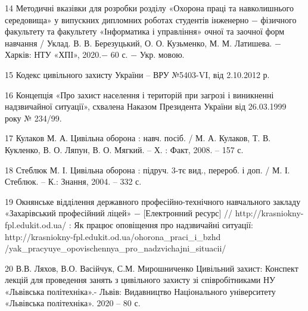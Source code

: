 14 Методичні вказівки для розробки розділу «Охорона праці та навколишнього середовища» у випускних дипломних роботах студентів інженерно $-$ фізичного факультету та факультету «Інформатика і управління» очної та заочної форм навчання / Уклад. В. В. Березуцький, О. О. Кузьменко, М. М. Латишева. $-$ Харків: НТУ «ХПІ», 2020.$-$ 60 с. $-$ Укр. мовою.

15 Кодекс цивільного захисту України – ВРУ №5403-VI, від 2.10.2012 р.

16 Концепція «Про захист населення і територій при загрозі і виникненні надзвичайної ситуації», схвалена Наказом Президента України від 26.03.1999 року № 234/99.

17 Кулаков М. А. Цивільна оборона : навч. посіб. / М. А. Кулаков, Т. В. Кукленко, В. О. Ляпун, В. О. Мягкий. – Х. : Факт, 2008. – 157 с.

18 Стеблюк М. І. Цивільна оборона  : підруч. 3-тє вид., перероб. і доп. / М. І. Стеблюк. – К.: Знання, 2004. – 332 с.

19 Окнянське відділення державного професійно-технічного навчального закладу «Захарівський професійний ліцей» $-$ [Електронний ресурс] // http://krasniokny-fpl.edukit.od.ua/ : Як працює оповіщення про надзвичайні ситуації: http://krasniokny-fpl.edukit.od.ua/ohorona\_praci\_i\_bzhd\\/yak\_pracyuye\_opovischennya\_pro\_nadzvichajni\_situacii/

20 В.В. Ляхов, В.О. Васійчук, С.М. Мирошниченко Цивільний захист: Конспект лекцій для проведення занять з цивільного захисту зі співробітниками НУ «Львівська політехніка».- Львів: Видавництво Національного університету «Львівська політехніка». 2020 – 80 с.
